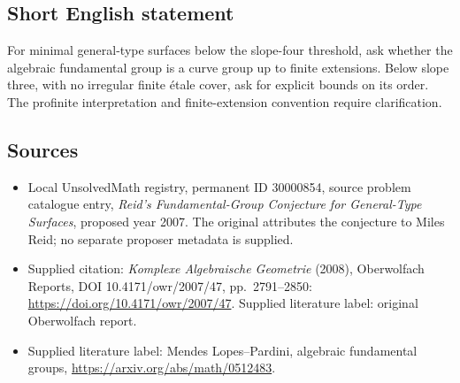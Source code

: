 \documentclass[11pt]{article}
\begin{document}
\subsection{Short English statement}
For minimal general-type surfaces below the slope-four threshold, ask whether the algebraic fundamental group is a curve group up to finite extensions. Below slope three, with no irregular finite \'etale cover, ask for explicit bounds on its order. The profinite interpretation and finite-extension convention require clarification.
\subsection{Sources}
\begin{itemize}\item Local UnsolvedMath registry, permanent ID 30000854, source problem catalogue entry, \emph{Reid's Fundamental-Group Conjecture for General-Type Surfaces}, proposed year 2007. The original attributes the conjecture to Miles Reid; no separate proposer metadata is supplied.\item Supplied citation: \emph{Komplexe Algebraische Geometrie} (2008), Oberwolfach Reports, DOI 10.4171/owr/2007/47, pp.\ 2791--2850: \url{https://doi.org/10.4171/owr/2007/47}. Supplied literature label: original Oberwolfach report.\item Supplied literature label: Mendes Lopes--Pardini, algebraic fundamental groups, \url{https://arxiv.org/abs/math/0512483}.\end{itemize}
\end{document}

